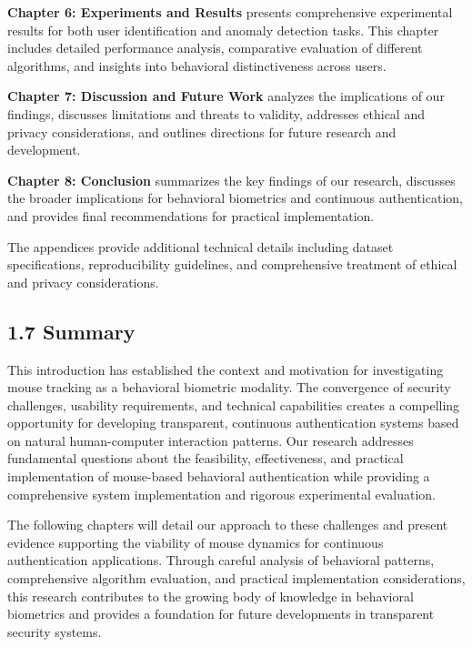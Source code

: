 \documentclass[
  11pt,
  a4paper,
]{article}
\begin{document}
\textbf{Chapter 6: Experiments and Results} presents comprehensive
experimental results for both user identification and anomaly detection
tasks. This chapter includes detailed performance analysis, comparative
evaluation of different algorithms, and insights into behavioral
distinctiveness across users.

\textbf{Chapter 7: Discussion and Future Work} analyzes the implications
of our findings, discusses limitations and threats to validity,
addresses ethical and privacy considerations, and outlines directions
for future research and development.

\textbf{Chapter 8: Conclusion} summarizes the key findings of our
research, discusses the broader implications for behavioral biometrics
and continuous authentication, and provides final recommendations for
practical implementation.

The appendices provide additional technical details including dataset
specifications, reproducibility guidelines, and comprehensive treatment
of ethical and privacy considerations.

\subsection{1.7 Summary}\label{summary}

This introduction has established the context and motivation for
investigating mouse tracking as a behavioral biometric modality. The
convergence of security challenges, usability requirements, and
technical capabilities creates a compelling opportunity for developing
transparent, continuous authentication systems based on natural
human-computer interaction patterns. Our research addresses fundamental
questions about the feasibility, effectiveness, and practical
implementation of mouse-based behavioral authentication while providing
a comprehensive system implementation and rigorous experimental
evaluation.

The following chapters will detail our approach to these challenges and
present evidence supporting the viability of mouse dynamics for
continuous authentication applications. Through careful analysis of
behavioral patterns, comprehensive algorithm evaluation, and practical
implementation considerations, this research contributes to the growing
body of knowledge in behavioral biometrics and provides a foundation for
future developments in transparent security systems.

\newpage

\newpage
\thispagestyle{plain}
\end{document}
